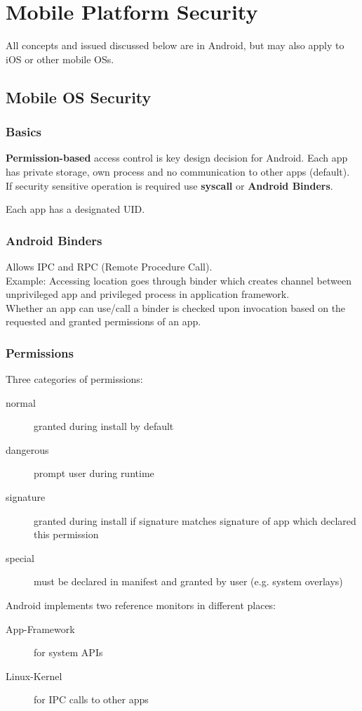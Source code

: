 \section{Mobile Platform Security}
All concepts and issued discussed below are in Android, but may also apply to iOS or other mobile OSs. 
\subsection{Mobile OS Security}
\subsubsection{Basics}
\textbf{Permission-based} access control is key design decision for Android.
Each app has private storage, own process and no communication to other apps (default). If security sensitive operation is required use \textbf{syscall} or \textbf{Android Binders}.

Each app has a designated UID.

\subsubsection{Android Binders}
Allows IPC and RPC (Remote Procedure Call).\\
Example: Accessing location goes through binder which creates channel between unprivileged app and privileged process in application framework.\\
Whether an app can use/call a binder is checked upon invocation based on the requested and granted permissions of an app.
\subsubsection{Permissions}
Three categories of permissions:\vspace{-1.5mm}
\begin{description}
    \item[normal] granted during install by default
    \item[dangerous] prompt user during runtime
    \item[signature] granted during install if signature matches signature of app which declared this permission
    \item[special] must be declared in manifest and granted by user (e.g. system overlays)
\end{description}

Android implements two reference monitors in different places:
\begin{description}
    \item[App-Framework] for system APIs
    \item[Linux-Kernel] for IPC calls to other apps
\end{description}

